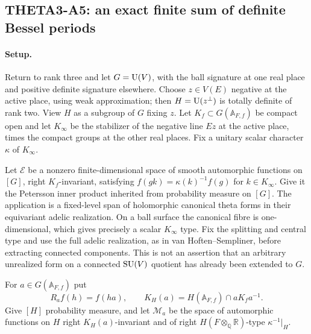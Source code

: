 \documentclass[11pt]{article}
\newcommand{\Q}{\mathbb Q}\newcommand{\C}{\mathbb C}\newcommand{\Z}{\mathbb Z}\newcommand{\R}{\mathbb R}\newcommand{\A}{\mathbb A}\newcommand{\OO}{\mathcal O}
\theoremstyle{definition}\newtheorem{definition}[theorem]{Definition}\newtheorem{remark}[theorem]{Remark}
\begin{document}
\subsection{THETA3-A5: an exact finite sum of definite Bessel periods}\label{A5}

\paragraph{Setup.}
Return to rank three and let $G=\operatorname{U}(V)$, with the ball signature at one
real place and positive definite signature elsewhere. Choose
$z\in V(E)$ negative at the active place, using weak approximation;
then $H=\operatorname{U}(z^\perp)$ is totally definite of rank two. View $H$ as a
subgroup of $G$ fixing $z$. Let $K_f\subset G(\A_{F,f})$ be compact
open and let $K_\infty$ be the stabilizer of the negative line $Ez$ at
the active place, times the compact groups at the other real places.
Fix a unitary scalar character $\kappa$ of $K_\infty$.

Let $\mathcal E$ be a nonzero finite-dimensional space of smooth
automorphic functions on $[G]$, right $K_f$-invariant, satisfying
$f(gk)=\kappa(k)^{-1}f(g)$ for $k\in K_\infty$. Give it the
Petersson inner product inherited from probability measure on $[G]$.
The application is a fixed-level span of holomorphic canonical theta
forms in their equivariant adelic realization. On a ball surface the
canonical fibre is one-dimensional, which gives precisely a scalar
$K_\infty$ type. Fix the splitting and central type and use the full
adelic realization, as in van Hoften--Sempliner, before extracting
connected components. This is not an assertion that an arbitrary
unrealized form on a connected $\operatorname{SU}(V)$ quotient has already been
extended to $G$.

For $a\in G(\A_{F,f})$ put
\[
 R_af(h)=f(ha),\qquad
 K_H(a)=H(\A_{F,f})\cap aK_fa^{-1}.
\]
Give $[H]$ probability measure, and let $\mathcal M_a$ be the space of
automorphic functions on $H$ right $K_H(a)$-invariant and of right
$H(F\otimes_\Q\R)$-type $\kappa^{-1}|_H$.
\end{document}
